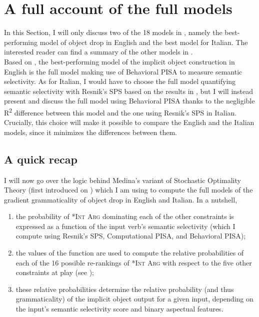 \section{A full account of the full models} 
In this Section, I will only discuss two of the 18 models in , namely the best-performing model of object drop in English and the best model for Italian. The interested reader can find a summary of the other models in .\\ %
Based on , the best-performing model of the implicit object construction in English is the full model making use of Behavioral PISA to measure semantic selectivity. As for Italian, I would have to choose the full model quantifying semantic selectivity with Resnik's SPS based on the results in , but I will instead present and discuss the full model using Behavioral PISA thanks to the negligible R\textsuperscript{2} difference between this model and the one using Resnik's SPS in Italian. Crucially, this choice will make it possible to compare the English and the Italian models, since it minimizes the differences between them.


\subsection{A quick recap} 

I will now go over the logic behind Medina's variant of Stochastic Optimality Theory (first introduced on ) which I am using to compute the full models of the gradient grammaticality of object drop in English and Italian. In a nutshell,

\begin{enumerate}
    \item the probability of \textsc{*Int Arg} dominating each of the other constraints is expressed as a function of the input verb's semantic selectivity (which I compute using Resnik's SPS, Computational PISA, and Behavioral PISA);
    \item the values of the function are used to compute the relative probabilities of each of the 16 possible re-rankings of \textsc{*Int Arg} with respect to the five other constraints at play (see );
    \item these relative probabilities determine the relative probability (and thus grammaticality) of the implicit object output for a given input, depending on the input's semantic selectivity score and binary aspectual features.
\end{enumerate}

